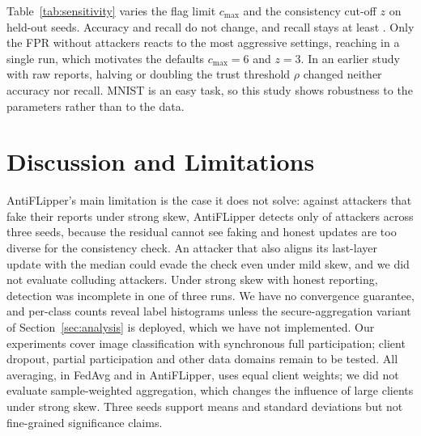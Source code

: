 \documentclass[conference]{IEEEtran}
\begin{document}
Table~\ref{tab:sensitivity} varies the flag limit $c_{\max}$ and the consistency cut-off $z$ on held-out seeds. Accuracy and recall do not change, and recall stays at least \sensRecallMin. Only the FPR without attackers reacts to the most aggressive settings, reaching \sensFPRmax{} in a single run, which motivates the defaults $c_{\max}{=}6$ and $z{=}3$. In an earlier study with raw reports, halving or doubling the trust threshold $\rho$ changed neither accuracy nor recall. MNIST is an easy task, so this study shows robustness to the parameters rather than to the data.

\section{Discussion and Limitations}
\label{sec:limits}
AntiFLipper's main limitation is the case it does not solve: against attackers that fake their reports under strong skew, AntiFLipper detects only \fsFound{} of \fsTotal{} attackers across three seeds, because the residual cannot see faking and honest updates are too diverse for the consistency check. An attacker that also aligns its last-layer update with the median could evade the check even under mild skew, and we did not evaluate colluding attackers. Under strong skew with honest reporting, detection was incomplete in one of three runs. We have no convergence guarantee, and per-class counts reveal label histograms unless the secure-aggregation variant of Section~\ref{sec:analysis} is deployed, which we have not implemented. Our experiments cover image classification with synchronous full participation; client dropout, partial participation and other data domains remain to be tested. All averaging, in FedAvg and in AntiFLipper, uses equal client weights; we did not evaluate sample-weighted aggregation, which changes the influence of large clients under strong skew. Three seeds support means and standard deviations but not fine-grained significance claims.

\end{document}
